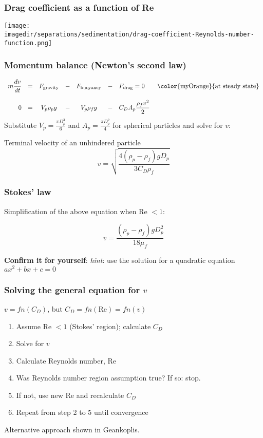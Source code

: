 \begin{frame}\frametitle{Drag coefficient as a function of Re}
	\begin{center}
		\texttt{[image: \\imagedir/separations/sedimentation/drag-coefficient-Reynolds-number-function.png]}
	\end{center}
\end{frame}

\begin{frame}\frametitle{Momentum balance (Newton's second law)}	
	\[
	\begin{array}{rcccccl}
		\displaystyle m\frac{dv}{dt} &=&  F_\text{gravity} &-& F_\text{buoyancy} &-& F_\text{drag} = 0 \qquad \text{\color{myOrange}{at steady state}} \\		
		\\
		0 &=&  V_p \rho_p g &-& V_p \rho_f g &-& C_D A_p \displaystyle \frac{\rho_f v^2}{2} 
	\end{array}
	\]
	Substitute $V_p = \displaystyle \frac{\pi D_p^3}{6}$ and $A_p = \displaystyle \frac{\pi D_p^2}{4}$ for spherical particles and solve for $v$:
	
	\begin{exampleblock}{Terminal velocity of an unhindered particle}
		\[
			v = \sqrt{\frac{4\left(\rho_p - \rho_f \right)g D_p}{3 C_D \rho_f}}
		\]
	\end{exampleblock}
\end{frame}

\begin{frame}\frametitle{Stokes' law}
	
	Simplification of the above equation when Re $< 1$:
	
	\[
		v = \frac{\left( \rho_p - \rho_f \right) g D_p^2}{18 \mu_f}
	\]	
	
	\vspace{12pt}
	\textbf{Confirm it for yourself}: \emph{hint}: use the solution for a quadratic equation $ax^2 + bx + c = 0$
\end{frame}

\begin{frame}\frametitle{Solving the general equation for $v$}
	
	$v = fn(C_D)$, but $C_D = fn(\text{Re}) = fn(v)$
	
	\begin{enumerate}
		\item	Assume Re $< 1$ (Stokes' region); calculate $C_D$
		\item	Solve for $v$
		\item	Calculate Reynolds number, Re
		\item	Was Reynolds number region assumption true? If so: stop. 
		\item	If not, use new Re and recalculate $C_D$
		\item	Repeat from step 2 to 5 until convergence		
	\end{enumerate}
	
	\vspace{12pt}
	Alternative approach shown in Geankoplis.	
\end{frame}

